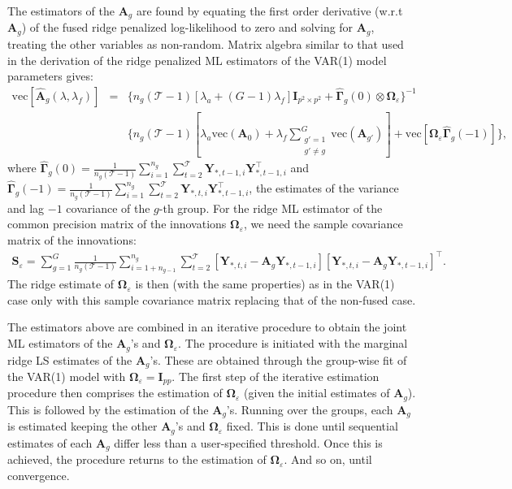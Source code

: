 The estimators of the $\mathbf{A}_g$ are found by equating the first order derivative (w.r.t $\mathbf{A}_g$) of the fused ridge penalized log-likelihood to zero and solving for $\mathbf{A}_g$, treating the other variables as non-random. Matrix algebra similar to that used in the derivation of the ridge penalized ML estimators of the VAR(1) model parameters gives:
\begin{eqnarray*}
\mbox{vec}[ \hat{\mathbf{A}}_g(\lambda,\lambda_f) ] & = & \{ n_g (\mathcal{T}-1) [ \lambda_a + (G-1)\lambda_f ] \mathbf{I}_{p^2\times p^2} + \widehat{\mathbf{\Gamma}}_g(0) \otimes \mathbf{\Omega}_{\varepsilon} \}^{-1}
\\
& & \{ n_g (\mathcal{T}-1) [\lambda_a \mbox{vec}(\mathbf{A}_0) + \lambda_f \sum_{ \substack{ g'=1 \\ g' \not= g} }^G \mbox{vec}(\mathbf{A}_{g'}) ] + \textrm{vec} [ \mathbf{\Omega}_{\varepsilon} \widehat{\mathbf{\Gamma}}_g(-1) ] \},
\end{eqnarray*}
where $\widehat{\mathbf{\Gamma}}_g(0) = \tfrac{1}{n_g(\mathcal{T}-1)} \sum_{i=1}^{n_g}\sum_{t=2}^{\mathcal{T}} \mathbf{Y}_{\ast,t-1,i}\mathbf{Y}_{\ast,t-1,i}^{\top}$ and \\
 $\widehat{\mathbf{\Gamma}}_g(-1) = \tfrac{1}{n_g(\mathcal{T}-1)} \sum_{i=1}^{n_g} \sum_{t=2}^{\mathcal{T}} \mathbf{Y}_{\ast, t, i} \mathbf{Y}_{\ast,t-1,i}^{\top}$, the estimates of the variance and lag $-1$ covariance of the $g$-th group. For the ridge ML estimator of the common precision matrix of the innovations $\boldsymbol{\Omega}_{\varepsilon}$, we need the sample covariance matrix of the innovations:
\begin{eqnarray*}
\mathbf{S}_{\varepsilon} =
\sum_{g=1}^{G} \frac{1}{n_g(\mathcal{T}-1)}
\sum_{i=1+n_{g-1}}^{n_g} \sum_{t=2}^{\mathcal{T}} \left[\mathbf{Y}_{\ast,t,i} - \mathbf{A}_g \mathbf{Y}_{\ast,t-1,i} \right] \left[\mathbf{Y}_{\ast,t,i} - \mathbf{A}_g\mathbf{Y}_{\ast,t-1,i} \right]^{\top}.
\end{eqnarray*}
The ridge estimate of $\boldsymbol{\Omega}_{\varepsilon}$ is then (with the same properties) as in the VAR(1) case only with this sample covariance matrix replacing that of the non-fused case.

The estimators above are combined in an iterative procedure to obtain the joint ML estimators of the $\mathbf{A}_g$'s and $\boldsymbol{\Omega}_{\varepsilon}$. The procedure is initiated with the marginal ridge LS estimates of the $\mathbf{A}_g$'s. These are obtained through the group-wise fit of  the VAR(1) model with $\boldsymbol{\Omega}_{\varepsilon} = \mathbf{I}_{pp}$. The first step of the iterative estimation procedure then comprises the estimation of $\boldsymbol{\Omega}_{\varepsilon}$ (given the initial estimates of $\mathbf{A}_g$). This is followed by the estimation of the $\mathbf{A}_g$'s. Running over the groups, each $\mathbf{A}_g$ is estimated keeping the other $\mathbf{A}_g$'s and $\boldsymbol{\Omega}_{\varepsilon}$ fixed. This is done until sequential estimates of each $\mathbf{A}_g$ differ less than a user-specified threshold. Once this is achieved, the procedure returns to the estimation of $\boldsymbol{\Omega}_{\varepsilon}$. And so on, until convergence.


